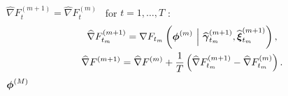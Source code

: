\begin{algorithm}
\begin{algorithmic}[1]
\begin{gather}
    \end{gather}
    \State $\widehat \nabla F_{t}^{(m+1)} = \widehat \nabla F_{t}^{(m)} \enspace$ for $t = 1,\ldots,T$ 
    :
        \begin{gather}
            \widehat \nabla F_{t_m}^{(m+1)} = \nabla F_{t_m}\left(\boldsymbol{\phi}^{(m)} ~ \Big | ~ \widehat {\boldsymbol{\gamma}}_{t_m}^{(m+1)}, \widehat {\boldsymbol{\xi}}_{t_m}^{(m+1)}\right), \\
            \widehat \nabla F^{(m+1)} = \widehat \nabla F^{(m)} + \frac{1}{T} \left( \widehat \nabla F_{t_m}^{(m+1)} - \widehat \nabla F_{t_m}^{(m)}\right).
        \end{gather}
    \EndIf
\EndFor
\State \Return $\boldsymbol{\phi}^{(M)}$
\end{algorithmic}
\end{algorithm}




